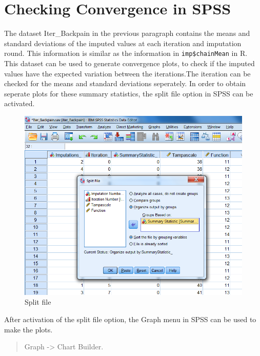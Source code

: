 \documentclass[
]{book}
\begin{document}
\hypertarget{checking-convergence-in-spss}{%
\section{Checking Convergence in SPSS}\label{checking-convergence-in-spss}}

The dataset Iter\_Backpain in the previous paragraph contains the means and standard deviations of the imputed values at each iteration and imputation round. This information is similar as the
information in \texttt{imp\$chainMean} in R. This dataset can be used to generate convergence plots, to check if the imputed values have the expected variation between the iterations.The iteration can be checked for the means and standard deviations seperately. In order to obtain seperate plots for these summary statistics, the split file option in SPSS can be activated.

\begin{figure}

{\centering \includegraphics[width=0.9\linewidth]{images/fig4.17} 

}

\caption{Split file}\label{fig:fig4-17}
\end{figure}

After activation of the split file option, the Graph menu in SPSS can be used to make the plots.

\begin{quote}
Graph -\textgreater{} Chart Builder.
\end{quote}
\end{document}
